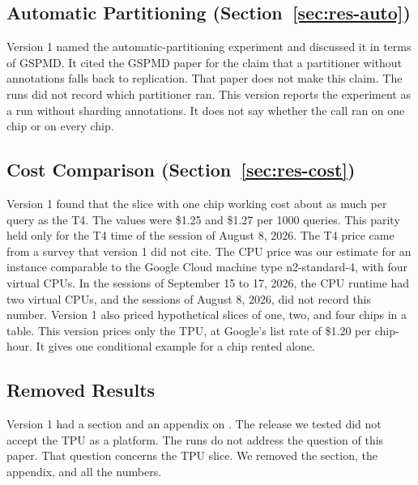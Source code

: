 \subsection*{Automatic Partitioning (Section~\ref{sec:res-auto})}
Version 1 named the automatic-partitioning experiment  and discussed it in terms of GSPMD.
It cited the GSPMD paper for the claim that a partitioner without annotations falls back to replication. That paper
does not make this claim. The runs did not record which partitioner ran. This version reports the experiment as a run
without sharding annotations. It does not say whether the call ran on one chip or on every chip.

\subsection*{Cost Comparison (Section~\ref{sec:res-cost})}
Version 1 found that the slice with one chip working cost about as much per query as the T4.
The values were \$1.25 and \$1.27 per 1000 queries. %
This parity held only for the T4 time of the session of August 8, 2026. %
The T4 price came from a survey that version 1 did not cite.
The CPU price was our estimate for an instance comparable to the Google Cloud machine type n2-standard-4, with four virtual CPUs. %
In the sessions of September 15 to 17, 2026, the CPU runtime had two virtual CPUs, and the sessions of August 8, 2026, did not record this number. %
Version 1 also priced hypothetical slices of one, two, and four chips in a table. This version prices only the TPU, at Google's list rate of \$1.20 per chip-hour. %
It gives one conditional example for a chip rented alone.

\subsection*{Removed \AFthree{} Results}
Version 1 had a section and an appendix on \AFthree{}. The release we tested did not accept the TPU as a platform.
The \AFthree{} runs do not address the question of this paper. That question concerns the TPU slice. We removed the
section, the appendix, and all the \AFthree{} numbers.

